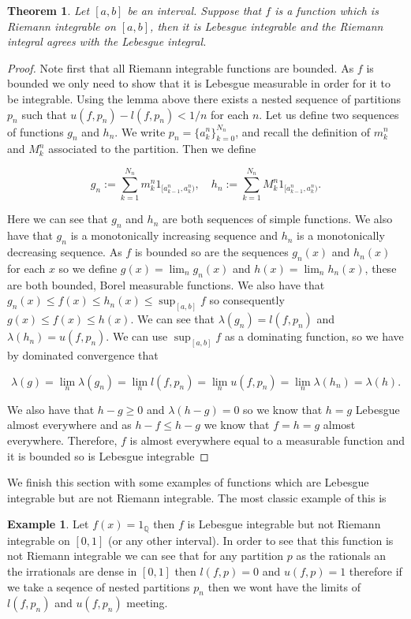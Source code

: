 \documentclass[
]{book}
\newtheorem{theorem}{Theorem}[chapter]
\theoremstyle{definition}
\theoremstyle{definition}
\newtheorem{example}{Example}[chapter]
\theoremstyle{definition}
\theoremstyle{definition}
\theoremstyle{remark}
\begin{document}
\begin{theorem}
Let \([a,b]\) be an interval. Suppose that \(f\) is a function which is Riemann integrable on \([a,b]\), then it is Lebesgue integrable and the Riemann integral agrees with the Lebesgue integral.
\end{theorem}

\begin{proof}
Note first that all Riemann integrable functions are bounded. As \(f\) is bounded we only need to show that it is Lebesgue measurable in order for it to be integrable.
Using the lemma above there exists a nested sequence of partitions \(p_n\) such that \(u(f,p_n) - l(f,p_n) < 1/n\) for each \(n\). Let us define two sequences of functions \(g_n\) and \(h_n\). We write \(p_n = \{ a^n_k \}_{k=0}^{N_n}\), and recall the definition of \(m^n_k\) and \(M^n_k\) associated to the partition. Then we define

\[ g_n:= \sum_{k=1}^{N_n} m^n_k 1_{[a_{k-1}^n, a_k^n)}, \quad h_n :=\sum_{k=1}^{N_n} M^n_k 1_{[a_{k-1}^n, a_k^n)}.\]

Here we can see that \(g_n\) and \(h_n\) are both sequences of simple functions. We also have that \(g_n\) is a monotonically increasing sequence and \(h_n\) is a monotonically decreasing sequence. As \(f\) is bounded so are the sequences \(g_n(x)\) and \(h_n(x)\) for each \(x\) so we define \(g(x) = \lim_n g_n(x)\) and \(h(x) = \lim_n h_n(x)\), these are both bounded, Borel measurable functions. We also have that \(g_n(x) \leq f(x) \leq h_n(x) \leq \sup_{[a,b]} f\) so consequently \(g(x) \leq f(x) \leq h(x)\). We can see that \(\lambda(g_n) = l(f,p_n)\) and \(\lambda(h_n) = u(f,p_n)\). We can use \(\sup_{[a,b]}f\) as a dominating function, so we have by dominated convergence that

\[ \lambda (g) = \lim_n \lambda(g_n) = \lim_n l(f,p_n) = \lim_n u(f,p_n) = \lim_n \lambda(h_n) = \lambda(h). \]

We also have that \(h-g \geq 0\) and \(\lambda(h-g) = 0\) so we know that \(h=g\) Lebesgue almost everywhere and as \(h-f \leq h-g\) we know that \(f=h=g\) almost everywhere. Therefore, \(f\) is almost everywhere equal to a measurable function and it is bounded so is Lebesgue integrable
\end{proof}

We finish this section with some examples of functions which are Lebesgue integrable but are not Riemann integrable. The most classic example of this is

\begin{example}
Let \(f(x) = 1_{\mathbb{Q}}\) then \(f\) is Lebesgue integrable but not Riemann integrable on \([0,1]\) (or any other interval). In order to see that this function is not Riemann integrable we can see that for any partition \(p\) as the rationals an the irrationals are dense in \([0,1]\) then \(l(f,p) =0\) and \(u(f,p) =1\) therefore if we take a seqence of nested partitions \(p_n\) then we wont have the limits of \(l(f,p_n)\) and \(u(f,p_n)\) meeting.
\end{example}
\end{document}
